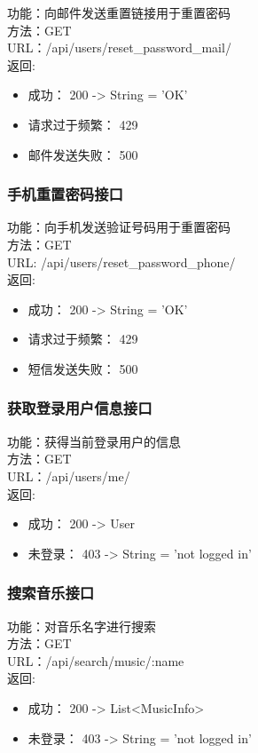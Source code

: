 \noindent
功能：向邮件发送重置链接用于重置密码\\
方法：GET\\
URL：/api/users/reset\_password\_mail/\\
返回:
\begin{itemize}
	\item 成功： 200 -> String = 'OK'
	\item 请求过于频繁： 429
	\item 邮件发送失败： 500
\end{itemize}


\subsubsection{手机重置密码接口}

\noindent
功能：向手机发送验证号码用于重置密码\\
方法：GET\\
URL: /api/users/reset\_password\_phone/\\
返回:
\begin{itemize}
	\item 成功： 200 -> String = 'OK'
	\item 请求过于频繁： 429
	\item 短信发送失败： 500
\end{itemize}



\subsubsection{获取登录用户信息接口}

\noindent
功能：获得当前登录用户的信息\\
方法：GET\\
URL：/api/users/me/\\
返回:
\begin{itemize}
	\item 成功： 200 -> User
	\item 未登录： 403 -> String = 'not logged in'
\end{itemize}


\subsubsection{搜索音乐接口}

\noindent
功能：对音乐名字进行搜索\\
方法：GET\\
URL：/api/search/music/:name\\
返回:
\begin{itemize}
	\item 成功： 200 -> List<MusicInfo>
	\item 未登录： 403 -> String = 'not logged in'
\end{itemize}

